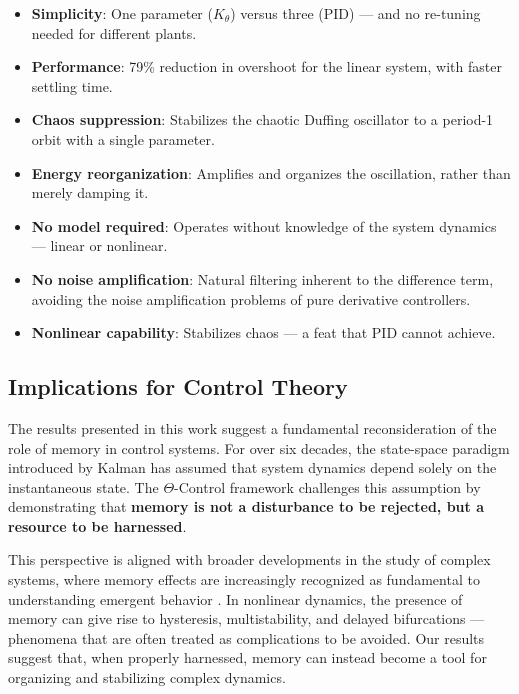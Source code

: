 \documentclass[12pt,a4paper]{article}
\begin{document}
\begin{itemize}
    \item \textbf{Simplicity}: One parameter ($K_\theta$) versus 
    three (PID) — and no re-tuning needed for different plants.
    
    \item \textbf{Performance}: 79\% reduction in overshoot for 
    the linear system, with faster settling time.
    
    \item \textbf{Chaos suppression}: Stabilizes the chaotic 
    Duffing oscillator to a period-1 orbit with a single parameter.
    
    \item \textbf{Energy reorganization}: Amplifies and organizes 
    the oscillation, rather than merely damping it.
    
    \item \textbf{No model required}: Operates without knowledge 
    of the system dynamics — linear or nonlinear.
    
    \item \textbf{No noise amplification}: Natural filtering 
    inherent to the difference term, avoiding the noise 
    amplification problems of pure derivative controllers.
    
    \item \textbf{Nonlinear capability}: Stabilizes chaos — a 
    feat that PID cannot achieve.
\end{itemize}

\subsection{Implications for Control Theory}

The results presented in this work suggest a fundamental 
reconsideration of the role of memory in control systems. 
For over six decades, the state-space paradigm introduced by 
Kalman has assumed that system dynamics depend solely on the 
instantaneous state. The $\Theta$-Control framework challenges 
this assumption by demonstrating that \textbf{memory is not a 
disturbance to be rejected, but a resource to be harnessed}.

This perspective is aligned with broader developments in the 
study of complex systems, where memory effects are increasingly 
recognized as fundamental to understanding emergent behavior 
\citep{Strogatz2018}. In nonlinear dynamics, the presence of 
memory can give rise to hysteresis, multistability, and 
delayed bifurcations — phenomena that are often treated as 
complications to be avoided. Our results suggest that, 
when properly harnessed, memory can instead become a tool 
for organizing and stabilizing complex dynamics.
\end{document}
